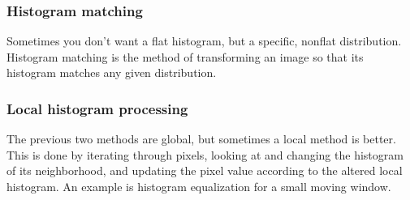 \subsubsection{Histogram matching}
Sometimes you don't want a flat histogram, but a specific, nonflat distribution. Histogram matching is the method of transforming an image so that its histogram matches any given distribution.

\subsubsection{Local histogram processing}
The previous two methods are global, but sometimes a local method is better. This is done by iterating through pixels, looking at and changing the histogram of its neighborhood, and updating the pixel value according to the altered local histogram. An example is histogram equalization for a small moving window.
